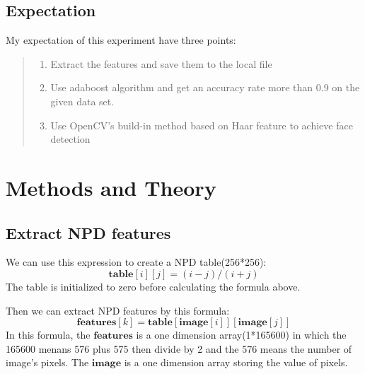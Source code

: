 \documentclass[journal, a4paper]{IEEEtran}
\begin{document}
\subsection{Expectation}
	My expectation of this experiment have three points:
	\begin{quote}
		\begin{enumerate}
			\item Extract the features and save them to the local file
			\item Use adaboost algorithm and get an accuracy rate more than 0.9 on the given data set.
			\item Use OpenCV's build-in method based on Haar feature to achieve face detection 
		\end{enumerate}
	\end{quote}
\par

\section{Methods and Theory}
\subsection{Extract NPD features}
We can use this expression to create a NPD table(256*256):
 \begin{equation}
	\boldsymbol{table}[i][j]=(i-j)/(i+j)
 \end{equation}
The table is initialized to zero before calculating the formula above.
\par 
Then we can extract NPD features by this formula:
\begin{equation}
		\boldsymbol{features}[k]=	\boldsymbol{table}[	\boldsymbol{image}[i]][	\boldsymbol{image}[j]]
\end{equation}
In this formula, the 	$\boldsymbol{features}$ is a one dimension array(1*165600) in which the 165600 menans 576 plus 575 then divide by 2 and the 576 means the number of image's pixels. The 	$\boldsymbol{image}$ is a one dimension array storing the value of pixels.\par
\end{document}

